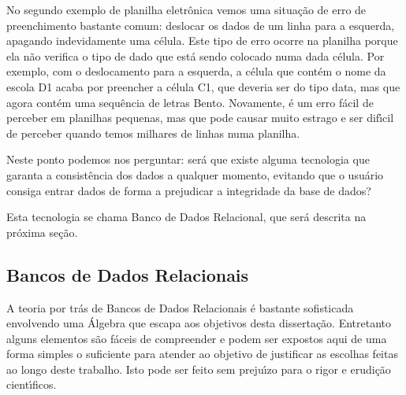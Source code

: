 \documentclass[
12pt,		%
openright,	%
twoside,  %
a4paper,			%
chapter=TITLE,		%
english,			%
french,				%
spanish,			%
brazil				%
]{USPSC-classe/USPSC}
\begin{document}
No segundo exemplo de planilha eletr\^onica vemos uma situa\c{c}\~ao de erro de preenchimento bastante comum: deslocar os dados de um linha para a esquerda, apagando indevidamente uma c\'elula. Este tipo de erro ocorre na planilha porque ela n\~ao verifica o tipo de dado que est\'a sendo colocado numa dada c\'elula. Por exemplo, com o deslocamento para a esquerda, a c\'elula que cont\'em o nome da escola D1 acaba por preencher a c\'elula C1, que deveria ser do tipo data, mas que agora cont\'em uma sequ\^encia de letras \textquotedbl Bento\textquotedbl . Novamente, \'e um erro f\'acil de perceber em planilhas pequenas, mas que pode causar muito estrago e ser dif\'{\i}cil de perceber quando temos milhares de linhas numa planilha.














Neste ponto podemos nos perguntar: ser\'a que existe alguma tecnologia que garanta a consist\^encia dos dados a qualquer momento, evitando que o usu\'ario consiga entrar dados de forma a prejudicar a integridade da base de dados?














Esta tecnologia se chama \textquotedbl Banco de Dados Relacional\textquotedbl , que ser\'a descrita na pr\'oxima se\c{c}\~ao.














\subsection[Bancos de Dados Relacionais]{Bancos de Dados Relacionais}\label{Bancos de Dados Relacionais}
A teoria por tr\'as de Bancos de Dados Relacionais \'e bastante sofisticada envolvendo uma \'Algebra que escapa aos objetivos desta disserta\c{c}\~ao. Entretanto alguns elementos s\~ao f\'aceis de compreender e podem ser expostos aqui de uma forma simples o suficiente para atender ao objetivo de justificar as escolhas feitas ao longo deste trabalho. Isto pode ser feito sem preju\'{\i}zo para o rigor e erudi\c{c}\~ao cient\'{\i}ficos.
\end{document}
